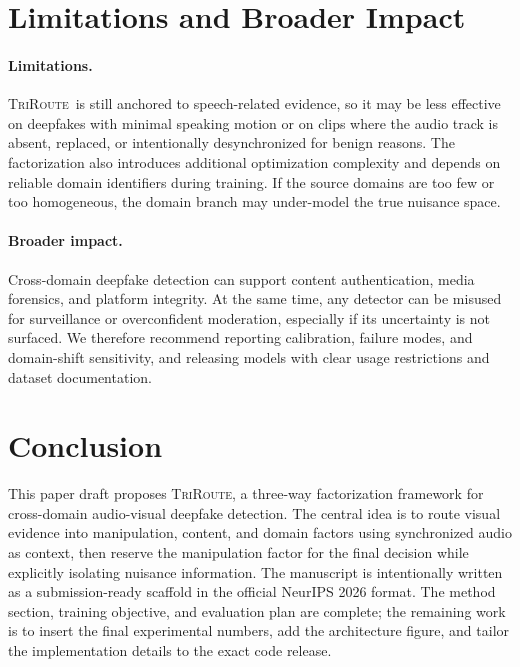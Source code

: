 \documentclass{article}
\newcommand{\method}{\textsc{TriRoute}}
\begin{document}
\section{Limitations and Broader Impact}

\paragraph{Limitations.}
\method\ is still anchored to speech-related evidence, so it may be less effective on deepfakes with minimal speaking motion or on clips where the audio track is absent, replaced, or intentionally desynchronized for benign reasons. The factorization also introduces additional optimization complexity and depends on reliable domain identifiers during training. If the source domains are too few or too homogeneous, the domain branch may under-model the true nuisance space.

\paragraph{Broader impact.}
Cross-domain deepfake detection can support content authentication, media forensics, and platform integrity. At the same time, any detector can be misused for surveillance or overconfident moderation, especially if its uncertainty is not surfaced. We therefore recommend reporting calibration, failure modes, and domain-shift sensitivity, and releasing models with clear usage restrictions and dataset documentation.

\section{Conclusion}

This paper draft proposes \method, a three-way factorization framework for cross-domain audio-visual deepfake detection. The central idea is to route visual evidence into manipulation, content, and domain factors using synchronized audio as context, then reserve the manipulation factor for the final decision while explicitly isolating nuisance information. The manuscript is intentionally written as a submission-ready scaffold in the official NeurIPS 2026 format. The method section, training objective, and evaluation plan are complete; the remaining work is to insert the final experimental numbers, add the architecture figure, and tailor the implementation details to the exact code release.




\newpage

\end{document}
